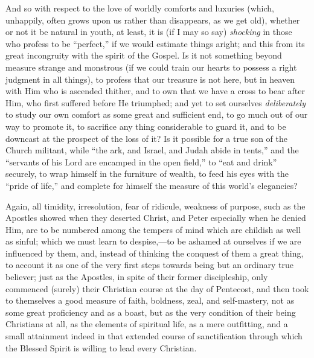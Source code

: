 And so with respect to the love of worldly comforts
and luxuries (which, unhappily, often grows upon us
rather than disappears, as we get old), whether or not it
be natural in youth, at least, it is (if I may so say) \emph{shocking}
in those who profess to be ``perfect,'' if we
would estimate things aright; and this from its great
incongruity with the spirit of the Gospel. Is it not
something beyond measure strange and monstrous (if we
could train our hearts to possess a right judgment in all
things), to profess that our treasure is not here, but in
heaven with Him who is ascended thither, and to own that
we have a cross to bear after Him, who first suffered
before He triumphed; and yet to set ourselves \emph{deliberately}
to study our own comfort as some great and sufficient
end, to go much out of our way to promote it, to
sacrifice any thing considerable to guard it, and to be
downcast at the prospect of the loss of it? Is it
possible for a true son of the Church militant, while
``the ark, and Israel, and Judah abide in
tents,'' and the ``servants of his Lord are encamped in
the open field,'' to ``eat and drink''
securely, to wrap himself in the furniture of wealth, to
feed his eyes with the ``pride of life,'' and
complete for himself the measure of this world's
elegancies?

Again, all timidity, irresolution, fear of ridicule,
weakness of purpose, such as the Apostles showed when
they deserted Christ, and Peter especially when he denied
Him, are to be numbered among the tempers of mind which
are childish as well as sinful; which we must learn to
despise,—to be ashamed at ourselves if we are
influenced by them, and, instead of thinking the conquest
of them a great thing, to account it as one of the very
first steps towards being but an ordinary true believer;
just as the Apostles, in spite of their former
discipleship, only commenced (surely) their Christian
course at the day of Pentecost, and then took to
themselves a good measure of faith, boldness, zeal, and
self-mastery, not as some great proficiency and as a
boast, but as the very condition of their being
Christians at all, as the elements of spiritual life, as
a mere outfitting, and a small attainment indeed in that
extended course of sanctification through which the
Blessed Spirit is willing to lead every Christian.


